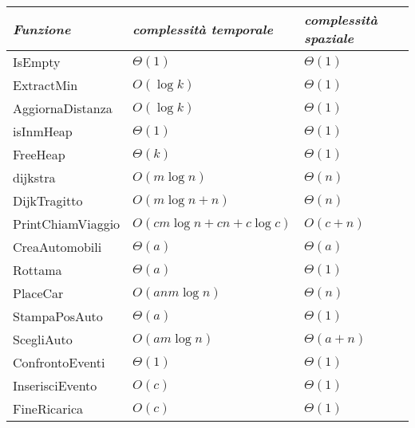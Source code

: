 \documentclass[a4paper,11pt]{Article}
\newcommand\T{\rule{0pt}{2.6ex}}       %
\newcommand\B{\rule[-1.2ex]{0pt}{0pt}} %
\begin{document}


\begin{tabular}{p{3.8cm}p{4cm}p{4cm}}
\textit{Funzione} & \textit{complessità temporale} & \textit{complessità spaziale} \B\\
\hline
IsEmpty\footnotemark[3]         & $\Theta(1)$                     & $\Theta(1)$ \T\\
ExtractMin\footnotemark[3]      & $O(\log{k})$                    & $\Theta(1)$ \T\\
AggiornaDistanza                & $O(\log{k})$                    & $\Theta(1)$ \T\\
isInmHeap                       & $\Theta(1)$                     & $\Theta(1)$ \T\\
FreeHeap                        & $\Theta(k)$                     & $\Theta(1)$ \T\\
dijkstra                        & $O(m\log{n})$                   & $\Theta(n)$ \T\\
DijkTragitto                    & $O(m\log{n} + n)$               & $\Theta(n)$ \T\\
PrintChiamViaggio               & $O(cm\log{n} +cn + c\log{c})$   & $O(c + n)$ \T\\
CreaAutomobili                  & $\Theta(a)$                     & $\Theta(a)$ \T\\
Rottama                         & $\Theta(a)$                     & $\Theta(1)$ \T\\
PlaceCar                        & $O(anm\log{n})$                 & $\Theta(n)$ \T\\
StampaPosAuto                   & $\Theta(a)$                     & $\Theta(1)$ \T\\
ScegliAuto                      & $O(am\log{n})$                  & $\Theta(a + n)$ \T\\
ConfrontoEventi                 & $\Theta(1)$                     & $\Theta(1)$ \T\\
InserisciEvento                 & $O(c)$                          & $\Theta(1)$ \T\\
FineRicarica                    & $O(c)$                          & $\Theta(1)$ \T\\

\end{tabular}
\end{document}
